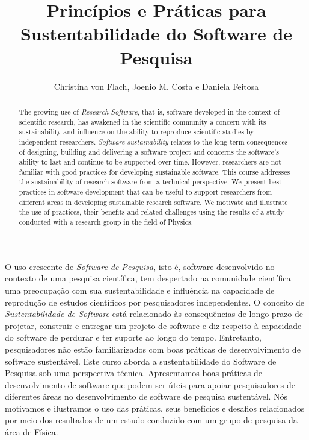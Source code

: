 \documentclass{SBCbookchapter}
\author{Christina von Flach, Joenio M. Costa e Daniela Feitosa}
\title{Princípios e Práticas para Sustentabilidade do Software de Pesquisa}
\begin{document}
\maketitle

\begin{abstract}
The growing use of \textit{Research Software}, that is, software developed in the context of scientific research, has awakened in the scientific community a concern with its sustainability and influence on the ability to reproduce scientific studies by independent researchers.
%
\textit{Software sustainability} relates to the long-term consequences of designing, building and delivering a software project and concerns the software's ability to last and continue to be supported over time.
%
However, researchers are not familiar with good practices for developing sustainable software.
%
This course addresses the sustainability of research software from a technical perspective. We present best practices in software development that can be useful to support researchers from different areas in developing sustainable research software. We motivate and illustrate the use of practices, their benefits and related challenges using the results of a study conducted with a research group in the field of Physics.
\end{abstract}


\begin{resumo}
O uso crescente de \textit{Software de Pesquisa}, isto é, software desenvolvido no contexto de uma pesquisa científica, tem despertado na comunidade científica uma preocupação com sua sustentabilidade e influência na capacidade de reprodução de estudos científicos por pesquisadores independentes.
%
O conceito de \textit{Sustentabilidade de Software} está relacionado às consequências de longo prazo de projetar, construir e entregar um projeto de software e diz respeito à capacidade do software de perdurar e ter suporte ao longo do tempo.
%
Entretanto, pesquisadores não estão familiarizados com boas práticas de desenvolvimento de software sustentável.
%
Este curso aborda a sustentabilidade do Software de Pesquisa sob uma perspectiva técnica. Apresentamos boas práticas de desenvolvimento de software que podem ser úteis para apoiar pesquisadores de diferentes áreas no desenvolvimento de software de pesquisa sustentável. Nós motivamos e ilustramos o uso das práticas, seus benefícios e desafios relacionados por meio dos resultados de um estudo conduzido com um grupo de pesquisa da área de Física.
\end{resumo}
\end{document}
